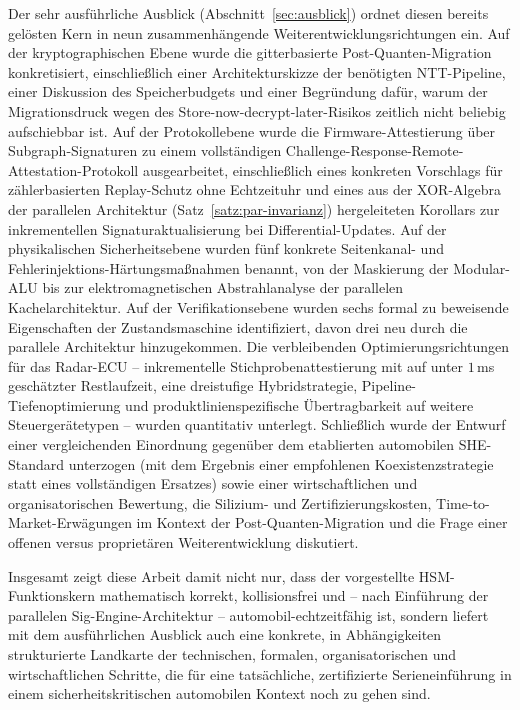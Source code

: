 ﻿\documentclass[a4paper,12pt]{article}
\theoremstyle{definition}
\begin{document}
Der sehr ausführliche Ausblick (Abschnitt~\ref{sec:ausblick}) ordnet diesen bereits gelösten Kern in neun zusammenhängende Weiterentwicklungsrichtungen ein. Auf der kryptographischen Ebene wurde die gitterbasierte Post-Quanten-Migration konkretisiert, einschließlich einer Architekturskizze der benötigten NTT-Pipeline, einer Diskussion des Speicherbudgets und einer Begründung dafür, warum der Migrationsdruck wegen des Store-now-decrypt-later-Risikos zeitlich nicht beliebig aufschiebbar ist. Auf der Protokollebene wurde die Firmware-Attestierung über Subgraph-Signaturen zu einem vollständigen Challenge-Response-Remote-Attestation-Protokoll ausgearbeitet, einschließlich eines konkreten Vorschlags für zählerbasierten Replay-Schutz ohne Echtzeituhr und eines aus der XOR-Algebra der parallelen Architektur (Satz~\ref{satz:par-invarianz}) hergeleiteten Korollars zur inkrementellen Signaturaktualisierung bei Differential-Updates. Auf der physikalischen Sicherheitsebene wurden fünf konkrete Seitenkanal- und Fehlerinjektions-Härtungsmaßnahmen benannt, von der Maskierung der Modular-ALU bis zur elektromagnetischen Abstrahlanalyse der parallelen Kachelarchitektur. Auf der Verifikationsebene wurden sechs formal zu beweisende Eigenschaften der Zustandsmaschine identifiziert, davon drei neu durch die parallele Architektur hinzugekommen. Die verbleibenden Optimierungsrichtungen für das Radar-ECU -- inkrementelle Stichprobenattestierung mit auf unter $1$\,ms geschätzter Restlaufzeit, eine dreistufige Hybridstrategie, Pipeline-Tiefenoptimierung und produktlinienspezifische Übertragbarkeit auf weitere Steuergerätetypen -- wurden quantitativ unterlegt. Schließlich wurde der Entwurf einer vergleichenden Einordnung gegenüber dem etablierten automobilen SHE-Standard unterzogen (mit dem Ergebnis einer empfohlenen Koexistenzstrategie statt eines vollständigen Ersatzes) sowie einer wirtschaftlichen und organisatorischen Bewertung, die Silizium- und Zertifizierungskosten, Time-to-Market-Erwägungen im Kontext der Post-Quanten-Migration und die Frage einer offenen versus proprietären Weiterentwicklung diskutiert.

Insgesamt zeigt diese Arbeit damit nicht nur, dass der vorgestellte HSM-Funktionskern mathematisch korrekt, kollisionsfrei und -- nach Einführung der parallelen Sig-Engine-Architektur -- automobil-echtzeitfähig ist, sondern liefert mit dem ausführlichen Ausblick auch eine konkrete, in Abhängigkeiten strukturierte Landkarte der technischen, formalen, organisatorischen und wirtschaftlichen Schritte, die für eine tatsächliche, zertifizierte Serieneinführung in einem sicherheitskritischen automobilen Kontext noch zu gehen sind.
\end{document}
